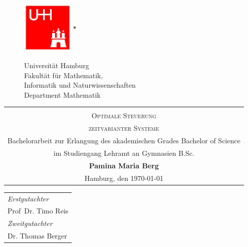 \begin{titlepage}


\begin{figure}[htbp]
		\begin{minipage}[b]{25mm}
			\includegraphics[width=25mm,clip]{images/logo_uhh}
		\end{minipage}
		\begin{minipage}[b]{2mm}
			\includegraphics[width=1mm,height=25mm]{images/greypixel}
		\end{minipage}
		\begin{minipage}[b]{12.5cm}
			{   
				\vspace{2mm}
				{\Large Universität Hamburg } \\
				Fakultät für Mathematik,\\
				Informatik und Naturwissenschaften \\
				Department Mathematik \\
			}
		\end{minipage}
	\end{figure}


\begin{center} 
\vspace{0.5cm} 
\begin{tabular}{c}
 \vspace{1.5cm}\\
\huge \textsc{Optimale Steuerung }\\
\vspace{0.5cm}
\huge \textsc{zeitvarianter Systeme}\\
\small Bachelorarbeit zur Erlangung des akademischen Grades Bachelor of Science\\
\vspace{1.25cm}
\small im Studiengang Lehramt an Gymnasien B.Sc.\\
\vspace{1.25cm}
\large \textbf{Pamina Maria Berg}\\
\normalsize Hamburg, den \today
\end{tabular}
\par 
\end{center}
\par
\vspace*{5cm}
\begin{tabular}{l}
\emph{Erstgutachter}\\
Prof\, Dr. Timo Reis\\
\emph{Zweitgutachter}\\
Dr. Thomas Berger
\end{tabular}

\end{titlepage}
